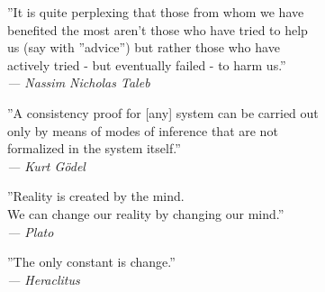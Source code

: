 \thispagestyle{plain}
\begin{flushright}
''It is quite perplexing that those from whom we have\\
benefited the most aren’t those who have tried to help\\
us (say with ''advice'') but rather those who have\\
actively tried - but eventually failed - to harm us.''\\

\textit{--- Nassim Nicholas Taleb}
\end{flushright}

\begin{flushright}
''A consistency proof for [any] system can be carried out\\
only by means of modes of inference that are not\\
formalized in the system itself.''\\

\textit{--- Kurt Gödel}
\end{flushright}

\begin{flushright}
''Reality is created by the mind.\\
We can change our reality by changing our mind.''\\

\textit{--- Plato}
\end{flushright}

\begin{flushright}
''The only constant is change.''\\

\textit{--- Heraclitus}
\end{flushright}